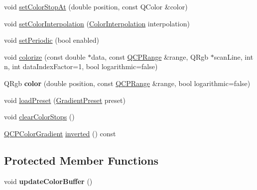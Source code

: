 \begin{DoxyCompactItemize}
\item 
void \hyperlink{class_q_c_p_color_gradient_a3b48be5e78079db1bb2a1188a4c3390e}{set\+Color\+Stop\+At} (double position, const Q\+Color \&color)
\item 
void \hyperlink{class_q_c_p_color_gradient_aa13fda86406e1d896a465a409ae63b38}{set\+Color\+Interpolation} (\hyperlink{class_q_c_p_color_gradient_ac5dca17cc24336e6ca176610e7f77fc1}{Color\+Interpolation} interpolation)
\item 
void \hyperlink{class_q_c_p_color_gradient_a39d6448155fc00a219f239220d14bb39}{set\+Periodic} (bool enabled)
\item 
void \hyperlink{class_q_c_p_color_gradient_aaf423ceb943e177b0ed2c48c811d83dc}{colorize} (const double $\ast$data, const \hyperlink{class_q_c_p_range}{Q\+C\+P\+Range} \&range, Q\+Rgb $\ast$scan\+Line, int n, int data\+Index\+Factor=1, bool logarithmic=false)
\item 
\hypertarget{class_q_c_p_color_gradient_a0599545c859268b025d2060dea741cea}{}\label{class_q_c_p_color_gradient_a0599545c859268b025d2060dea741cea} 
Q\+Rgb {\bfseries color} (double position, const \hyperlink{class_q_c_p_range}{Q\+C\+P\+Range} \&range, bool logarithmic=false)
\item 
void \hyperlink{class_q_c_p_color_gradient_aa0aeec1528241728b9671bf8e60b1622}{load\+Preset} (\hyperlink{class_q_c_p_color_gradient_aed6569828fee337023670272910c9072}{Gradient\+Preset} preset)
\item 
void \hyperlink{class_q_c_p_color_gradient_a939213e85f0d1279519d555c5fcfb6ad}{clear\+Color\+Stops} ()
\item 
\hyperlink{class_q_c_p_color_gradient}{Q\+C\+P\+Color\+Gradient} \hyperlink{class_q_c_p_color_gradient_a9f72f501de429829ec446333316decda}{inverted} () const
\end{DoxyCompactItemize}
\subsection*{Protected Member Functions}
\begin{DoxyCompactItemize}
\item 
\hypertarget{class_q_c_p_color_gradient_a353f15ab3ab586eebf1f6b58c3e2707b}{}\label{class_q_c_p_color_gradient_a353f15ab3ab586eebf1f6b58c3e2707b} 
void {\bfseries update\+Color\+Buffer} ()
\end{DoxyCompactItemize}
